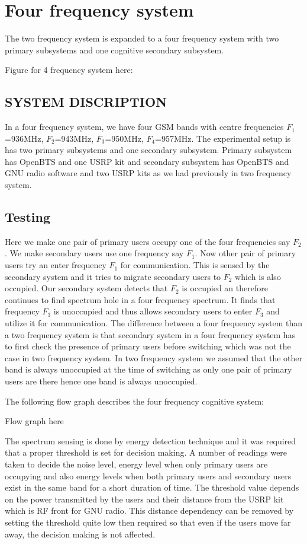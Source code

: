 \section{Four frequency system}
The two frequency system is expanded to a four frequency system with two 
primary subsystems and one cognitive secondary subsystem.


Figure for 4 frequency system here:

\subsection{SYSTEM DISCRIPTION}
In a four frequency system, we have four GSM bands with centre frequencies 
$F_1$=936MHz, $F_2$=943MHz, $F_3$=950MHz, $F_4$=957MHz. The experimental setup 
is has two primary subsystems and one secondary subsystem. Primary subsystem 
has OpenBTS and one USRP kit and secondary subsystem has OpenBTS and GNU radio 
software and two USRP kits as we had previously in two frequency system.
 



\subsection{Testing}
Here we make one pair of primary users occupy one of the four frequencies say 
$F_2$. We make secondary users use one frequency say $F_1$. Now other pair of 
primary users try an enter frequency $F_1$ for communication. This is sensed by 
the secondary system and it tries to migrate secondary users to $F_2$ which is 
also occupied. Our secondary system detects that $F_2$ is occupied an therefore 
continues to find spectrum hole in a four frequency spectrum. It finds that 
frequency $F_3$ is unoccupied and thus allows secondary users to enter $F_3$ 
and utilize it for communication. The difference between a four frequency 
system than a two frequency system is that secondary system in a four frequency 
system has to first check the presence of primary users before switching which 
was not the case in two frequency system. In two frequency system we assumed 
that the other band is always unoccupied at the time of switching as only one 
pair of primary users are there hence one band is always unoccupied.

The following flow graph describes the four frequency cognitive system:

Flow graph here

The spectrum sensing is done by energy detection technique and it was required 
that a proper threshold is set for decision making. A number of readings were 
taken to decide the noise level, energy level when only primary users are 
occupying and also energy levels when both primary users and secondary users 
exist in the same band for a short duration of time. The threshold value 
depends on the power transmitted by the users and their distance from the USRP 
kit which is RF front for GNU radio. This distance dependency can be removed by 
setting the threshold quite low then required so that even if the users move 
far away, the decision making is not affected.  





